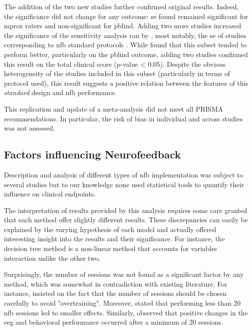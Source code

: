 The addition of the two new studies \citep{Strehl2017, Baumeister2016} further confirmed original results. Indeed, the
significance did not change for any outcome: \gls{se} found remained significant for \gls{mprox} raters and
non-significant for \gls{pblind}. Adding two more studies increased the significance of the sensitivity analysis ran by
\citeauthor{Cortese2016}, most notably, the \gls{se} of studies corresponding to \gls{nfb} standard protocols \citet{Arns2014}. 
While \citeauthor{Cortese2016} found that this subset tended to perform better, particularly on the \gls{pblind} outcome, 
adding two studies confirmed this result on the total clinical score (p-value < 0.05). Despite the obvious heterogeneity 
of the studies included in this subset (particularly in terms of protocol used), this result suggests a positive relation 
between the features of this \emph{standard} design and \gls{nfb} performance.

This replication and update of a meta-analysis did not meet all PRISMA recommendations. In particular, the risk of bias
in individual and across studies was not assessed.  


\subsection{Factors influencing Neurofeedback}

Description and analysis of different types of \gls{nfb} implementation was subject to several studies \citep{Arns2014, 
Enriquez2017, Vernon2004, Jeunet2018} but to our knowledge none used statistical tools to quantify their influence on
clinical endpoints. 

The interpretation of results provided by this analysis requires some care granted that each method offer slightly
different results. These discrepancies can easily be explained by the varying hypothesis of each model and actually
offered interesting insight into the results and their significance. For instance, the decision tree method is a
non-linear method that accounts for variables interaction unlike the other two. 

Surprisingly, the number of sessions was not found as a significant factor by any method, which was somewhat
in contradiction with existing literature. For instance, \citet{Enriquez2017} insisted on the fact that the number of
sessions should be chosen carefully to avoid "overtraining". Moreover, \citet{Arns2014} stated that performing less than
20 \gls{nfb} sessions led to smaller effects. Similarly, \citet{Vernon2004} observed that positive changes in the \gls{eeg}
and behavioral performance occurred after a minimum of 20 sessions. 

